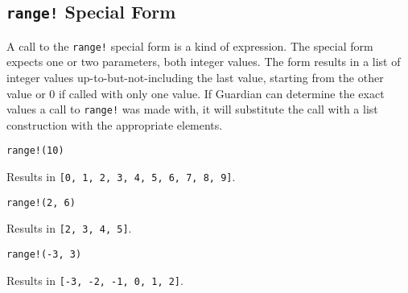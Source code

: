 
\subsection{\texttt{range!} Special Form}
{
	A call to the \texttt{range!} special form is a kind of expression.
	The special form expects one or two parameters, both integer values.
	The form results in a list of integer values up-to-but-not-including
	the last value, starting from the other value or 0 if called with only
	one value.
	If Guardian can determine the exact values a call to \texttt{range!}
	was made with, it will substitute the call with a list construction
	with the appropriate elements.
	
	\begin{itemize}
	{
		\item \texttt{range!(10)}
		
			Results in \texttt{[0, 1, 2, 3, 4, 5, 6, 7, 8, 9]}.
		
		\item \texttt{range!(2, 6)}
		
			Results in \texttt{[2, 3, 4, 5]}.
			
		\item \texttt{range!(-3, 3)}
		
			Results in \texttt{[-3, -2, -1, 0, 1, 2]}.
	}
	\end{itemize}
}
